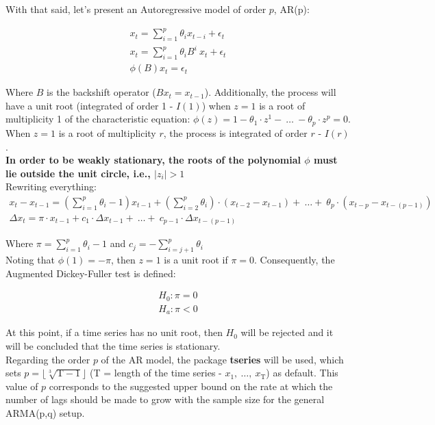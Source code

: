 \documentclass[a4paper]{article}
\begin{document}
With that said, let's present an Autoregressive model of order $p$, AR(p):

\begin{align*}
	x_t = \sum_{i = 1}^{p} \theta_i x_{t-i} + \epsilon_t\\
	x_t = \sum_{i = 1}^{p} \theta_i B^i \ x_{t} + 
	\epsilon_t\\
	\phi(B) x_t = \epsilon_t 
\end{align*}

Where $B$ is the backshift operator ($B x_t = x_{t-1}$). 
Additionally, the process will have a unit root (integrated of order 1 - 
$I(1)$) when $z = 1$ is a root of multiplicity 1 of the characteristic 
equation: $\phi(z) = 1 - \theta_1 \cdot z^1 -\ \ldots \ - \theta_p \cdot z^p 
= 0$. When $z = 1$ is a root of multiplicity $r$, the process is integrated 
of order $r$ - $I(r)$.\\

\textbf{In order to be weakly stationary, the roots of the polynomial $\phi$ 
must lie outside the unit circle, i.e., $|z_i| > 1$}\\

Rewriting everything:
\begin{align*}
	x_t - x_{t-1} = \left(\sum_{i = 1}^p \theta_i - 1 \right)
	x_{t-1} + \left(\sum_{i = 2}^p \theta_i \right) \cdot 
	(x_{t-2} - x_{t-1}) +\ \ldots +\ \theta_p \cdot 
	(x_{t-p} - x_{t-(p-1)}) \\
	\Delta x_t = \pi \cdot x_{t-1} + c_1 \cdot 
	\Delta x_{t-1} +\ \ldots +\ c_{p-1} \cdot 
	\Delta x_{t-(p-1)}
\end{align*}

Where $\pi = \sum_{i = 1}^p \theta_i -1$ and $c_j = - \sum_{i = j+1}^p 
\theta_i$\\

Noting that $\phi(1) = -\pi$, then $z = 1$ is a unit root if $\pi = 0$. 
Consequently, the Augmented Dickey-Fuller test is defined:

\begin{align*}
	H_0 : \pi = 0\\
	H_a : \pi < 0
\end{align*}

At this point, if a time series has no unit root, then $H_0$ will be 
rejected and it will be concluded that the time series is stationary.\\

Regarding the order $p$ of the AR model, the package \textbf{tseries} will 
be used, which sets $p = \lfloor \sqrt[3]{\text{T} - 1} \rfloor$ (T  = 
length of the time series - $x_1 ,\ \ldots ,\ x_\text{T}$) 
as default. This value of $p$ corresponds to the suggested upper bound on 
the rate at which the number of lags should be made to grow with the sample 
size for the general ARMA(p,q) setup.\\ %
\end{document}
